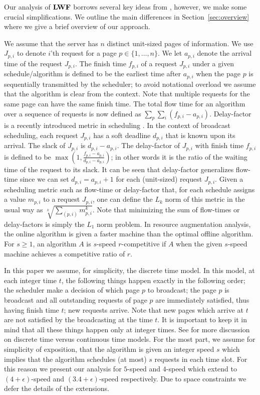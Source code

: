 \documentclass[11pt]{article}
\newcommand{\eps}{\epsilon}
\begin{document}
\begin{titlepage}
Our analysis of ${\texttt{\bf{LWF}}}$ borrows several key ideas from
\cite{EdmondsP04}, however, we make some crucial simplifications. We
outline the main differences in Section~\ref{sec:overview} where we
give a brief overview of our approach.

\medskip
{} We assume that
the server has $n$ distinct unit-sized pages of
information.  We use $J_{p,i}$ to denote $i$'th request for a page
$p \in \{1, \ldots, n\}$.  We let $a_{p,i}$ denote the arrival
time of the request $J_{p,i}$. The finish time $f_{p,i}$ of a
request $J_{p,i}$ under a given schedule/algorithm is defined to
be the earliest time after $a_{p,i}$ when the page $p$ is
sequentially transmitted by the scheduler; to avoid notational
overload we assume that the algorithm is clear from the context.
Note that multiple requests for the same page can have the same
finish time. The total flow time for an algorithm over a sequence
of requests is now defined as $\sum_p \sum_i (f_{p,i} - a_{p,i})$.
Delay-factor is a recently introduced metric in scheduling
\cite{ChangEGK08,BenderCT08,ChekuriM09}.  In the context of
broadcast scheduling, each request $J_{p,i}$ has a soft deadline
$d_{p,i}$ that is known upon its arrival. The slack of $J_{p,i}$
is $d_{p,i} - a_{p,i}$. The delay-factor of $J_{p,i}$ with finish
time $f_{p,i}$ is defined to be $\max(1, \frac{f_{p,i} -
a_{p,i}}{d_{p,i} - a_{p,i}})$; in other words it is the ratio of
the waiting time of the request to its slack. It can be seen that
delay-factor generalizes flow-time since we can set $d_{p,i} =
a_{p,i} + 1$ for each (unit-sized) request $J_{p,i}$. Given a
scheduling metric such as flow-time or delay-factor that, for each
schedule assigns a value $m_{p,i}$ to a request $J_{p,i}$, one can
define the $L_k$ norm of this metric in the usual way as
$\sqrt[k]{\sum_{(p,i)} m_{p,i}^k}$. Note that minimizing the sum
of flow-times or delay-factors is simply the $L_1$ norm problem.
In resource augmentation analysis, the online algorithm is given a
faster machine than the optimal offline algorithm. For $s \ge 1$,
an algorithm $A$ is $s$-speed $r$-competitive if $A$ when the
given $s$-speed machine achieves a competitive ratio of $r$.

In this paper we assume, for simplicity, the discrete time model. In
this model, at each integer time $t$, the following things happen
exactly in the following order; the scheduler make a decision of which
page $p$ to broadcast; the page $p$ is broadcast and all outstanding
requests of page $p$ are immediately satisfied, thus having finish
time $t$; new requests arrive. Note that new pages which arrive at $t$
are not satisfied by the broadcasting at the time $t$. It is important
to keep it in mind that all these things happen only at integer times.
See \cite{EdmondsP04} for more discussion on discrete time versus
continuous time models. For the most part, we assume for simplicity
of exposition, that the algorithm is given an integer speed $s$ which
implies that the algorithm schedules (at most) $s$ requests in each
time slot.  For this reason we present our analysis for $5$-speed and
$4$-speed which extend to $(4+\eps)$-speed and $(3.4+\eps)$-speed
respectively.  Due to space constraints we defer the details of the
extensions.


\end{titlepage}
\end{document}

